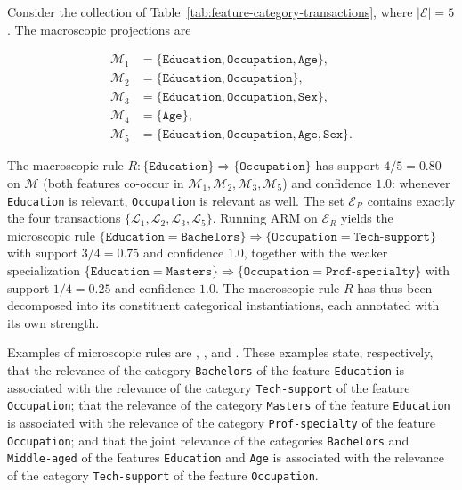 Consider the collection of Table~\ref{tab:feature-category-transactions}, where $|\mathcal{E}| = 5$. The macroscopic projections are

\begin{equation*}
  \begin{aligned}
    \mathcal{M}_1 &= \{\texttt{Education}, \texttt{Occupation}, \texttt{Age}\}, \\
    \mathcal{M}_2 &= \{\texttt{Education}, \texttt{Occupation}\}, \\
    \mathcal{M}_3 &= \{\texttt{Education}, \texttt{Occupation}, \texttt{Sex}\}, \\
    \mathcal{M}_4 &= \{\texttt{Age}\}, \\
    \mathcal{M}_5 &= \{\texttt{Education}, \texttt{Occupation}, \texttt{Age}, \texttt{Sex}\}.
  \end{aligned}
\end{equation*}

The macroscopic rule $R : \{\texttt{Education}\} \Rightarrow \{\texttt{Occupation}\}$ has support $4/5 = 0.80$ on $\mathcal{M}$ (both features co-occur in $\mathcal{M}_1, \mathcal{M}_2, \mathcal{M}_3, \mathcal{M}_5$) and confidence $1.0$: whenever \texttt{Education} is relevant, \texttt{Occupation} is relevant as well. The set $\mathcal{E}_R$ contains exactly the four transactions $\{\mathcal{L}_1, \mathcal{L}_2, \mathcal{L}_3, \mathcal{L}_5\}$. Running ARM on $\mathcal{E}_R$ yields the microscopic rule $\{\texttt{Education}{=}\texttt{Bachelors}\} \Rightarrow \{\texttt{Occupation}{=}\texttt{Tech-support}\}$ with support $3/4 = 0.75$ and confidence $1.0$, together with the weaker specialization $\{\texttt{Education}{=}\texttt{Masters}\} \Rightarrow \{\texttt{Occupation}{=}\texttt{Prof-specialty}\}$ with support $1/4 = 0.25$ and confidence $1.0$. The macroscopic rule $R$ has thus been decomposed into its constituent categorical instantiations, each annotated with its own strength.

Examples of microscopic rules are , , and . These examples state, respectively, that the relevance of the category \texttt{Bachelors} of the feature \texttt{Education} is associated with the relevance of the category \texttt{Tech-support} of the feature \texttt{Occupation}; that the relevance of the category \texttt{Masters} of the feature \texttt{Education} is associated with the relevance of the category \texttt{Prof-specialty} of the feature \texttt{Occupation}; and that the joint relevance of the categories \texttt{Bachelors} and \texttt{Middle-aged} of the features \texttt{Education} and \texttt{Age} is associated with the relevance of the category \texttt{Tech-support} of the feature \texttt{Occupation}.

